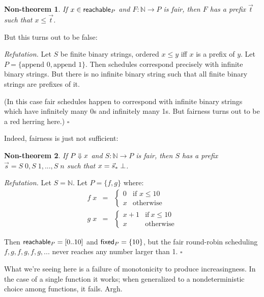 \documentclass{article}
\newcommand{\N}{\mathbb{N}}
\newcommand{\todo}[1]{{\color{red}{#1}}}
\newtheorem{nontheorem}{Non-theorem}
\newenvironment{refutation}
  {\vspace{0.5em}\noindent\textit{Refutation.}}
  {\hfill$\square$\vspace{0.5em}}
\begin{document}
\begin{nontheorem}
  If $x \in \textsf{{reachable}}_{P}$ and $F : \N \to P$ is fair, then $F$ has a prefix
  $\vec{t}$ such that $x \le \vec{t}$.
\end{nontheorem}

But this turns out to be false:

\begin{refutation}
  Let $S$ be finite binary strings, ordered $x \le y$ iff $x$ is a prefix of
  $y$. Let $P = \{\text{append }0, \text{append }1\}$. Then schedules correspond
  precisely with infinite binary strings. But there is no infinite binary string
  such that all finite binary strings are prefixes of it.

  (In this case fair schedules happen to correspond with infinite binary strings
  which have infinitely many 0s and infinitely many 1s. But fairness turns out
  to be a red herring here.)
\end{refutation}

Indeed, fairness is just not sufficient:

\begin{nontheorem}
  If $P \Downarrow x$ and $S : \N \to P$ is fair, then $S$ has a prefix $\vec{s} =
  S\;0, S\;1, ..., S\;n$ such that $x = {\vec{s}_*}\;\bot$.
\end{nontheorem}

\begin{refutation}
  Let $S = \N$. Let $P = \{f,g\}$ where:
  \[
  \begin{array}{rcl}
    f\; x &=& 
    \begin{cases}
      0 & \text{if }x \le 10\\
      x & \text{otherwise}
    \end{cases}\\
    g\; x &=&
    \begin{cases}
      x+1 & \text{if}~x \le 10\\
      x   & \text{otherwise}
    \end{cases}
  \end{array}
  \]

  Then $\textsf{{reachable}}_{P} = [0..10]$ and $\textsf{{fixed}}_{P} = \{10\}$, but the fair round-robin
  scheduling $f,g,f,g,f,g,...$ never reaches any number larger than 1.
\end{refutation}

What we're seeing here is a failure of monotonicity to produce increasingness.
In the case of a single function it works; when generalized to a
nondeterministic choice among functions, it fails. Argh.


\end{document}
